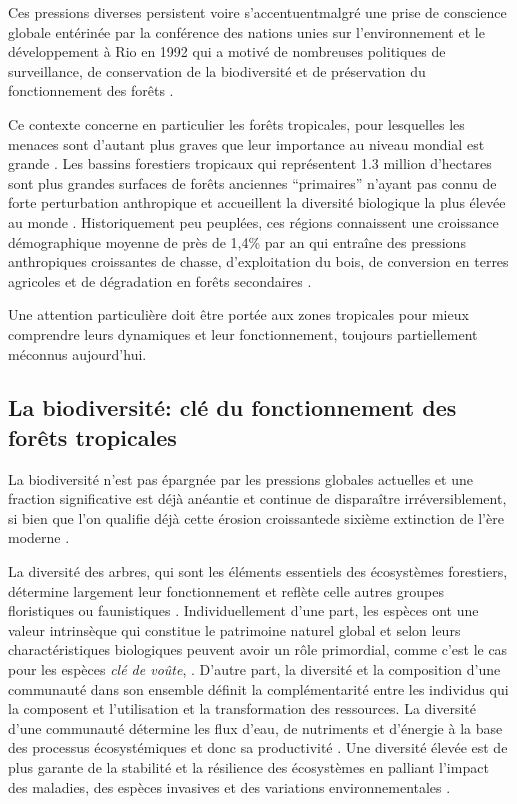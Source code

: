 \documentclass[
  11pt,
  french,
  A4paper,
  extrafontsizes,onecolumn,openright
  ]{memoir}
\begin{document}
Ces pressions diverses persistent voire s'accentuentmalgré une prise de
conscience globale entérinée par la conférence des nations unies sur
l'environnement et le développement à Rio en 1992 qui a motivé de
nombreuses politiques de surveillance, de conservation de la
biodiversité et de préservation du fonctionnement des forêts
\autocites{Summit1992}{Schlaepfer2000}{Dirzo2003a}{Morales-Hidalgo2015}.

Ce contexte concerne en particulier les forêts tropicales, pour
lesquelles les menaces sont d'autant plus graves que leur importance au
niveau mondial est grande \autocites{Dirzo2003a}{Hansen2013}. Les
bassins forestiers tropicaux qui représentent 1.3 million d'hectares
sont plus grandes surfaces de forêts anciennes ``primaires'' n'ayant pas
connu de forte perturbation anthropique et accueillent la diversité
biologique la plus élevée au monde \autocites{Gentry1988}{FAO2011}.
Historiquement peu peuplées, ces régions connaissent une croissance
démographique moyenne de près de 1,4\% par an qui entraîne des pressions
anthropiques croissantes de chasse, d'exploitation du bois, de
conversion en terres agricoles et de dégradation en forêts secondaires
\autocite{Asner2009}.

Une attention particulière doit être portée aux zones tropicales pour
mieux comprendre leurs dynamiques et leur fonctionnement, toujours
partiellement méconnus aujourd'hui.

\subsection{La biodiversité: clé du fonctionnement des forêts
tropicales}\label{la-biodiversite-cle-du-fonctionnement-des-forets-tropicales}

La biodiversité n'est pas épargnée par les pressions globales actuelles
et une fraction significative est déjà anéantie et continue de
disparaître irréversiblement, si bien que l'on qualifie déjà cette
érosion croissantede sixième extinction de l'ère moderne
\autocites{Vitousek1997}{Cardinale2012}.

La diversité des arbres, qui sont les éléments essentiels des
écosystèmes forestiers, détermine largement leur fonctionnement et
reflète celle autres groupes floristiques ou faunistiques
\autocite{Guitet2017}. Individuellement d'une part, les espèces ont une
valeur intrinsèque qui constitue le patrimoine naturel global et selon
leurs charactéristiques biologiques peuvent avoir un rôle primordial,
comme c'est le cas pour les espèces \emph{clé de voûte},
\autocites{Jones1994}{Power1996}{Gardner2007}. D'autre part, la
diversité et la composition d'une communauté dans son ensemble définit
la complémentarité entre les individus qui la composent et l'utilisation
et la transformation des ressources. La diversité d'une communauté
détermine les flux d'eau, de nutriments et d'énergie à la base des
processus écosystémiques et donc sa productivité \autocite{Begon2006}.
Une diversité élevée est de plus garante de la stabilité et la
résilience des écosystèmes en palliant l'impact des maladies, des
espèces invasives et des variations environnementales
\autocite{Elmqvist2003}.
\end{document}
